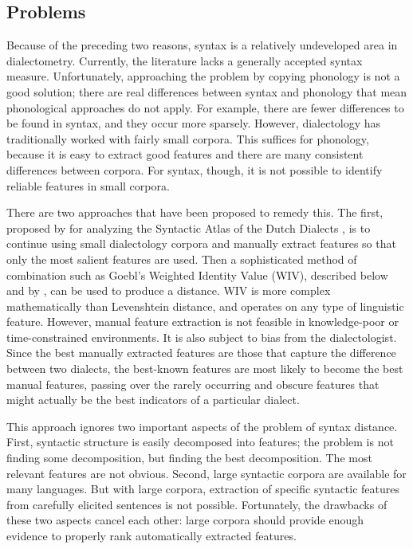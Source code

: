 \subsection{Problems}

Because of the preceding two reasons, syntax is a relatively
undeveloped area in dialectometry. Currently, the literature lacks a
generally accepted syntax measure. Unfortunately, approaching the
problem by copying phonology is not a good solution; there are real
differences between syntax and phonology that mean phonological
approaches do not apply. For example, there are fewer differences to be
found in syntax, and they occur more sparsely.
However, dialectology has traditionally worked with fairly small
corpora. This suffices for phonology, because
it is easy to extract good features and there are many
consistent differences between corpora. For syntax, though, it is not possible
to identify reliable features in small corpora.

There are two approaches that have been proposed to remedy this. The
first, proposed by  for analyzing the Syntactic
Atlas of the Dutch Dialects \cite{barbiers05}, is to continue using
small dialectology corpora and manually extract features so that only
the most salient features are used. Then a sophisticated method of
combination such as Goebl's Weighted Identity Value (WIV), described
below and by , can be used to produce a
distance. WIV is more complex mathematically than Levenshtein
distance, and operates on any type of linguistic feature. However, manual feature
extraction is not feasible in knowledge-poor or time-constrained
environments. It is also subject to bias from the
dialectologist. Since the best manually extracted features are those that capture
the difference between two dialects, the best-known features are most
likely to become the best manual features, passing over the rarely
occurring and obscure features that might actually be the best
indicators of a particular dialect.

This approach ignores two important aspects of the problem of syntax
distance. First, syntactic structure is easily decomposed into
features; the problem is not finding some decomposition, but finding
the best decomposition. The most relevant features are not obvious.
Second, large syntactic corpora are
available for many languages. But with large corpora, extraction of specific
syntactic features from carefully elicited sentences is not
possible. Fortunately, the drawbacks of these two aspects cancel each other:
large corpora should provide enough evidence to properly rank
automatically extracted features.

